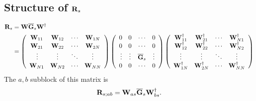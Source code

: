 \documentclass[letterpaper]{article}
\begin{document}
\subsection*{Structure of $\mathbf{R}_s$}

{\scriptsize
\begin{align*}
 \vb R_s &= \vb W \overline{\vb G}_s \vb W^\dagger
\\
&=\left(\begin{array}{cccc}
  \vphantom{\vb W^\dagger_11} 
  \vb W_{11} & \vb W_{12} & \cdots & \vb W_{1N} 
\\ 
  \vphantom{\vb W^\dagger_11} 
  \vb W_{21} & \vb W_{22} & \cdots & \vb W_{2N} 
\\ 
  \vphantom{\vb W^\dagger_11} 
  \vdots     & \vdots     & \ddots & \vdots     
\\
  \vphantom{\vb W^\dagger_11} 
  \vb W_{N1} & \vb W_{N2} & \cdots & \vb W_{NN}
  \end{array}\right)
 \left(\begin{array}{cccc}
  \vphantom{\vb W^\dagger_11} 
  0          & 0          & \cdots &         0          
  \\ 
  \vphantom{\vb W^\dagger_11} 
  0          & 0          & \cdots &         0          
  \\ 
  \vphantom{\vb W^\dagger_11} 
  \vdots     & \vdots     & \overline{\vb G}_{s} &  \vdots     
  \\
  \vphantom{\vb W^\dagger_11} 
  0          & 0          & \cdots &         0
  \end{array}\right)
  \left(\begin{array}{cccc}
  \vb W_{11}^\dagger & \vb W_{21}^\dagger & \cdots & \vb W_{N1}^\dagger \\ 
  \vb W_{12}^\dagger & \vb W_{22}^\dagger & \cdots & \vb W_{N2}^\dagger \\ 
  \vdots     & \vdots     & \ddots & \vdots     \\
  \vb W_{1N}^\dagger & \vb W_{2N}^\dagger & \cdots & \vb W_{NN}^\dagger
  \end{array}\right)
\end{align*}
}
The $a,b$ subblock of this matrix is
$$ \mathbf{R}_{s; ab} = \mathbf{W}_{as} \overline{\mathbf{G}}_s \mathbf{W}_{bs}^\dagger. $$
\end{document}

